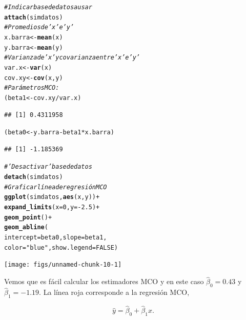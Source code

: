 \documentclass{article}\usepackage[]{graphicx}\usepackage[]{color}
\makeatletter
\newcommand{\hlnum}[1]{\textcolor[rgb]{0.686,0.059,0.569}{#1}}%
\newcommand{\hlstr}[1]{\textcolor[rgb]{0.192,0.494,0.8}{#1}}%
\newcommand{\hlcom}[1]{\textcolor[rgb]{0.678,0.584,0.686}{\textit{#1}}}%
\newcommand{\hlopt}[1]{\textcolor[rgb]{0,0,0}{#1}}%
\newcommand{\hlstd}[1]{\textcolor[rgb]{0.345,0.345,0.345}{#1}}%
\newcommand{\hlkwb}[1]{\textcolor[rgb]{0.69,0.353,0.396}{#1}}%
\newcommand{\hlkwc}[1]{\textcolor[rgb]{0.333,0.667,0.333}{#1}}%
\newcommand{\hlkwd}[1]{\textcolor[rgb]{0.737,0.353,0.396}{\textbf{#1}}}%
\newenvironment{kframe}{%
 \def\at@end@of@kframe{}%
 \ifinner\ifhmode%
  \def\at@end@of@kframe{\end{minipage}}%
  \begin{minipage}{\columnwidth}%
 \fi\fi%
 \def\FrameCommand##1{\hskip\@totalleftmargin \hskip-\fboxsep
 \colorbox{shadecolor}{##1}\hskip-\fboxsep
     \hskip-\linewidth \hskip-\@totalleftmargin \hskip\columnwidth}%
 \MakeFramed {\advance\hsize-\width
   \@totalleftmargin\z@ \linewidth\hsize
   \@setminipage}}%
 {\par\unskip\endMakeFramed%
 \at@end@of@kframe}
\newenvironment{knitrout}{}{} %
\makeatother
\begin{document}
\begin{knitrout}
\color{fgcolor}\begin{kframe}
\begin{alltt}
\hlcom{# Indicar base de datos a usar}
\hlkwd{attach}\hlstd{(simdatos)}
\hlcom{# Promedios de 'x' e 'y'}
\hlstd{x.barra} \hlkwb{<-} \hlkwd{mean}\hlstd{(x)}
\hlstd{y.barra} \hlkwb{<-} \hlkwd{mean}\hlstd{(y)}
\hlcom{# Varianza de 'x' y covarianza entre 'x' e 'y'}
\hlstd{var.x} \hlkwb{<-} \hlkwd{var}\hlstd{(x)}
\hlstd{cov.xy} \hlkwb{<-} \hlkwd{cov}\hlstd{(x,y)}
\hlcom{# Parámetros MCO:}
\hlstd{(beta1} \hlkwb{<-} \hlstd{cov.xy}\hlopt{/}\hlstd{var.x)}
\end{alltt}
\begin{verbatim}
## [1] 0.4311958
\end{verbatim}
\begin{alltt}
\hlstd{(beta0} \hlkwb{<-} \hlstd{y.barra} \hlopt{-} \hlstd{beta1}\hlopt{*}\hlstd{x.barra)}
\end{alltt}
\begin{verbatim}
## [1] -1.185369
\end{verbatim}
\begin{alltt}
\hlcom{# 'Desactivar' base de datos}
\hlkwd{detach}\hlstd{(simdatos)}
\hlcom{# Graficar línea de regresión MCO}
\hlkwd{ggplot}\hlstd{(simdatos,} \hlkwd{aes}\hlstd{(x,y))} \hlopt{+}
  \hlkwd{expand_limits}\hlstd{(}\hlkwc{x} \hlstd{=} \hlnum{0}\hlstd{,} \hlkwc{y} \hlstd{=} \hlopt{-}\hlnum{2.5}\hlstd{)} \hlopt{+}
  \hlkwd{geom_point}\hlstd{()} \hlopt{+}
  \hlkwd{geom_abline}\hlstd{(}
    \hlkwc{intercept} \hlstd{= beta0,} \hlkwc{slope} \hlstd{= beta1,}
    \hlkwc{color} \hlstd{=} \hlstr{"blue"}\hlstd{,} \hlkwc{show.legend} \hlstd{=} \hlnum{FALSE} \hlstd{)}
\end{alltt}
\end{kframe}

{\centering \texttt{[image: figs/unnamed-chunk-10-1]} 

}



\end{knitrout}

Vemos que es fácil calcular los estimadores MCO y en este caso $\hat \beta_0 = 0.43$ y $\hat \beta_1 = -1.19$. La línea roja corresponde a la regresión MCO,

\begin{equation*}
\hat y = \hat \beta_0 + \hat \beta_1 x.
\end{equation*}
\end{document}
